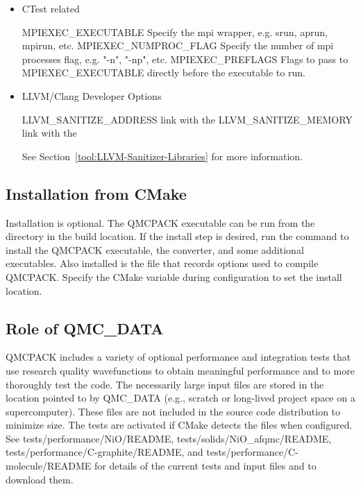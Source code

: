 \begin{itemize}
\item CTest related
%
\begin{shade}
MPIEXEC_EXECUTABLE     Specify the mpi wrapper, e.g. srun, aprun, mpirun, etc.
MPIEXEC_NUMPROC_FLAG   Specify the number of mpi processes flag,
                       e.g. "-n", "-np", etc.
MPIEXEC_PREFLAGS       Flags to pass to MPIEXEC_EXECUTABLE directly before the executable to run.
\end{shade}

\item LLVM/Clang Developer Options\\
\begin{shade}
LLVM_SANITIZE_ADDRESS     link with the %
LLVM_SANITIZE_MEMORY      link with the %
\end{shade}

See Section~\ref{tool:LLVM-Sanitizer-Libraries} for more information.
\end{itemize}

\subsection{Installation from CMake}
Installation is optional. The QMCPACK executable can be run from the  directory in the build location.
If the install step is desired, run the  command to install the QMCPACK executable, the converter,
and some additional executables.
Also installed is the  file that records options used to compile QMCPACK.
Specify the  CMake variable during configuration to set the install location.


\subsection{Role of QMC\_DATA}
QMCPACK includes a variety of optional performance and integration
tests that use research quality wavefunctions to obtain meaningful
performance and to more thoroughly test the code. The necessarily
large input files are stored in the location pointed to by QMC\_DATA (e.g., scratch or long-lived project space on a supercomputer). These
files are not included in the source code distribution to minimize
size. The tests are activated if CMake detects the files when
configured. See tests/performance/NiO/README,
tests/solids/NiO\_afqmc/README, tests/performance/C-graphite/README, and tests/performance/C-molecule/README
for details of the current tests and input files and to download them.

